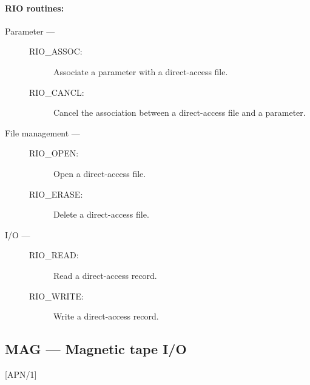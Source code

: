 \vspace*{10mm}

\paragraph{RIO routines:}

\begin{description}

\item [Parameter ---]

\begin{description}
\item [RIO\_ASSOC:]  Associate a parameter with a direct-access file.
\item [RIO\_CANCL:]  Cancel the association between a direct-access file and a
 parameter.
\end{description}

\item [File management ---]

\begin{description}
\item [RIO\_OPEN:]  Open a direct-access file.
\item [RIO\_ERASE:]  Delete a direct-access file.
\end{description}

\item [I/O ---]

\begin{description}
\item [RIO\_READ:]  Read a direct-access record.
\item [RIO\_WRITE:]  Write a direct-access record.
\end{description}

\end{description}

\newpage

\subsection{MAG --- Magnetic tape I/O}
\label{R_MAG}

\vspace{-9mm}

\hfill [APN/1]

\vspace{2mm}

